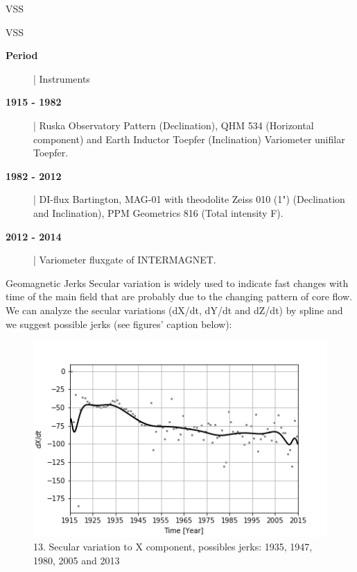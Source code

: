 \documentclass[final,t]{beamer}
\begin{document}
\begin{columns}[t]
\begin{column}{.25\linewidth}
\begin{block}{VSS}
\end{block}


\begin{block}{VSS}
\centering

	\begin{description}
		\item[\textbf{Period}] | \hspace{0.5cm} Instruments 
				
			\item[\textbf{1915 - 1982}]| Ruska Observatory Pattern (Declination), QHM 534 (Horizontal component) and Earth Inductor Toepfer (Inclination) Variometer unifilar Toepfer.
		\end{description}
	
	 	\begin{description}
	 		\item[\textbf{1982 - 2012}]| DI-flux Bartington, MAG-01 with theodolite Zeiss 010 (1") (Declination and Inclination), PPM Geometrics 816 (Total intensity F).
	 	\end{description}
	
	 
	\begin{description}
		\item[\textbf{2012 - 2014}]| Variometer fluxgate of INTERMAGNET.
		
	\end{description}
	
\end{block}



\begin{block}{Geomagnetic Jerks}
Secular variation is widely used to indicate fast changes with time of the main field that are probably due to the changing pattern of core flow.	
We can analyze the secular variations (dX/dt, dY/dt and dZ/dt) by spline and we suggest possible jerks (see figures' caption below): 		
	\begin{figure}
		\centering
		\includegraphics[width=0.8\linewidth]{spline101sv_X_spline}
		\caption{13. Secular variation to X component, possibles jerks: 1935, 1947, 1980, 2005 and 2013}
		\label{SPLINEx}
	\end{figure}
	

\end{block}
\end{column}
\end{columns}
\end{document}
